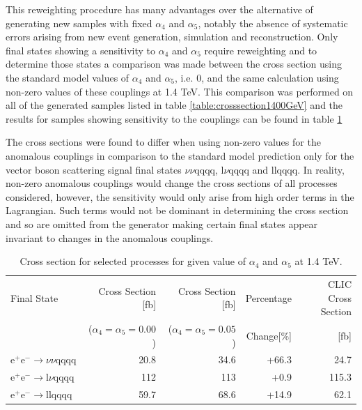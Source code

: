 This reweighting procedure has many advantages over the alternative of generating new samples with fixed $\alpha_{4}$ and $\alpha_{5}$, notably the absence of systematic errors arising from new event generation, simulation and reconstruction.  Only final states showing a sensitivity to $\alpha_{4}$ and $\alpha_{5}$ require reweighting and to determine those states a comparison was made between the cross section using the standard model values of $\alpha_{4}$ and $\alpha_{5}$, i.e. 0, and the same calculation using non-zero values of these couplings at 1.4 TeV.  This comparison was performed on all of the generated samples listed in table \ref{table:crosssection1400GeV} and the results for samples showing sensitivity to the couplings can be found in table \ref{table:crosssectionsensitivity1400}

The cross sections were found to differ when using non-zero values for the anomalous couplings in comparison to the standard model prediction only for the vector boson scattering signal final states $\nu\nu\text{qqqq}$, $\text{l}\nu\text{qqqq}$ and llqqqq.  In reality, non-zero anomalous couplings would change the cross sections of all processes considered, however, the sensitivity would only arise from high order terms in the Lagrangian.  Such terms would not be dominant in determining the cross section and so are omitted from the generator making certain final states appear invariant to changes in the anomalous couplings.

\begin{table}[h!]
\centering
\begin{tabular}{ l r r r r }
\hline
Final State & Cross Section [fb] & Cross Section [fb] & Percentage & CLIC Cross Section \\ 
& ($\alpha_{4} = \alpha_{5} = 0.00$) & ($\alpha_{4} = \alpha_{5} = 0.05$) & Change[\%] & [fb] \\ 
\hline
$\text{e}^{+}\text{e}^{-} \rightarrow \nu{\nu}\text{qqqq}$ & 20.8 & 34.6 & +66.3 & 24.7 \\
$\text{e}^{+}\text{e}^{-} \rightarrow \text{l}{\nu}\text{qqqq}$ & 112 & 113 & +0.9 & 115.3 \\
$\text{e}^{+}\text{e}^{-} \rightarrow \text{llqqqq}$ & 59.7 & 68.6 & +14.9 & 62.1 \\
\hline
\end{tabular}
\caption{Cross section for selected processes for given value of $\alpha_{4}$ and $\alpha_{5}$ at 1.4 TeV.}
\label{table:crosssectionsensitivity1400}
\end{table}

